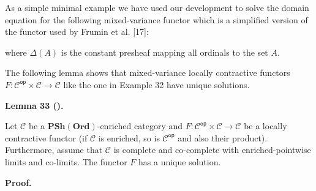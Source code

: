  
As a simple minimal example we have used our development to solve the domain equation for the following mixed-variance functor which is a simplified version of the functor used by Frumin et al. [17]:\par
 
\begin{center}\end{center}
 
where $\Delta(A)$ is the constant presheaf mapping all ordinals to the set $A$.\par
 
 
 
 
The following lemma shows that mixed-variance locally contractive functors $F:{\mathcal{C}}^{\mathsf{op}}\times\mathcal{C}\to\mathcal{C}$ like the one in Example 32 have unique solutions.\par
 
 
 
\par\medskip\noindent\textbf{Lemma 33 ().}\par
 
 
Let $\mathcal{C}$ be a $\mathbf{PSh}(\mathbf{Ord})$-enriched category and $F:{\mathcal{C}}^{\mathsf{op}}\times\mathcal{C}\to\mathcal{C}$ be a locally contractive functor (if $\mathcal{C}$ is enriched, so is ${\mathcal{C}}^{\mathsf{op}}$ and also their product). Furthermore, assume that $\mathcal{C}$ is complete and co-complete with enriched-pointwise limits and co-limits. The functor $F$ has a unique solution.\par
 
 
 
 
\par\medskip\noindent\textbf{Proof.}\par
 
 
